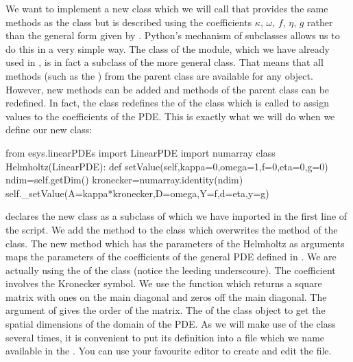 We want to implement a 
new class which we will call  that provides the same methods as the \LinearPDE class but
is described using the coefficients $\kappa$, $\omega$, $f$, $\eta$, 
$g$ rather than the general form given by . 
Python's mechanism of subclasses allows us to do this in a very simple way.
The \Poisson class of the \linearPDEsPack module,
which we have already used in , is in fact a subclass of the more general
\LinearPDE class. That means that all methods (such as the )
from the parent class \LinearPDE are available for any \Poisson object. However, new
methods can be added and methods of the parent class can be redefined. In fact,
the \Poisson class redefines the  of the \LinearPDE class which is called to assign 
values to the coefficients of the PDE. This is exactly what we will do when we define 
our new  class:
\begin{python}
from esys.linearPDEs import LinearPDE
import numarray
class Helmholtz(LinearPDE):
   def setValue(self,kappa=0,omega=1,f=0,eta=0,g=0)
        ndim=self.getDim()
        kronecker=numarray.identity(ndim)
        self._setValue(A=kappa*kronecker,D=omega,Y=f,d=eta,y=g)
\end{python}
 declares the new  class as a subclass 
of \LinearPDE which we have imported in the first line of the script. 
We add the method  to the class which overwrites the 
 method of the \LinearPDE class. The new method which has the 
parameters of the Helmholtz  as arguments 
maps the parameters of the coefficients of the general PDE defined 
in . We are actually using the  of 
the \LinearPDE class (notice the leeding underscoure). 
The coefficient  involves the Kronecker symbol. We use the
\numarray function  which returns a square matrix with ones on the
main diagonal and zeros off the main diagonal. The argument of  gives the order of the matrix.
The  of the \LinearPDE class object  to get the spatial dimensions of the domain of the
PDE. As we will make use of the  class several times, it is convenient to 
put its definition into a file which we name  available in the \ExampleDirectory.
You can use your favourite editor to create and edit the file.   


